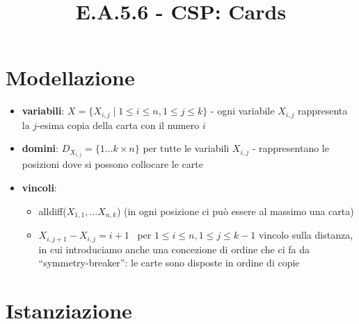 \documentclass[12pt]{article}
\title{E.A.5.6 - CSP: Cards}
\author{}
\date{}
\begin{document}
\maketitle
\vspace{-5em}
\section{Modellazione}

\begin{itemize}
    \item \textbf{variabili}: $X = \{X_{i,j} \mid 1 \leq i \leq n, 1 \leq j \leq k\}$ - ogni variabile $X_{i, j}$ rappresenta la $j$-esima copia della carta con il numero $i$

    \item \textbf{domini}: $D_{X_{i,j}} = \{1 \dots k \times n\}$ per tutte le variabili $X_{i, j}$ - rappresentano le posizioni dove si possono collocare le carte

    \item \textbf{vincoli}: 
        \begin{itemize}
            \item alldiff($X_{1,1}, \dots X_{n, k}$) (in ogni posizione ci può essere al massimo una carta)
            \item $X_{i, j+1} - X_{i,j} = i+1$ \ per $1 \leq i \leq n, 1 \leq j \leq k-1$ 
                \subitem vincolo sulla distanza, in cui introduciamo anche una concezione di ordine che ci fa da ``symmetry-breaker'': le carte sono disposte in ordine di copie
        \end{itemize}
\end{itemize}


\section{Istanziazione}
\end{document}

